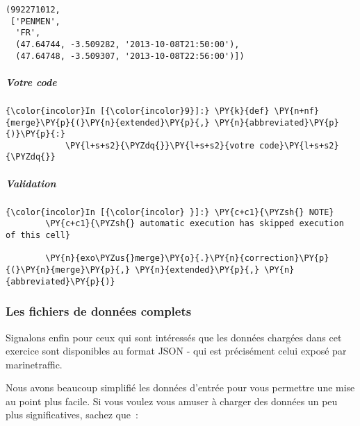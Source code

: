     \begin{Verbatim}[commandchars=\\\{\}]
(992271012,
 ['PENMEN',
  'FR',
  (47.64744, -3.509282, '2013-10-08T21:50:00'),
  (47.64748, -3.509307, '2013-10-08T22:56:00')])

    \end{Verbatim}

    \hypertarget{votre-code}{%
\subparagraph{Votre code}\label{votre-code}}

    \begin{Verbatim}[commandchars=\\\{\}]
{\color{incolor}In [{\color{incolor}9}]:} \PY{k}{def} \PY{n+nf}{merge}\PY{p}{(}\PY{n}{extended}\PY{p}{,} \PY{n}{abbreviated}\PY{p}{)}\PY{p}{:}
            \PY{l+s+s2}{\PYZdq{}}\PY{l+s+s2}{votre code}\PY{l+s+s2}{\PYZdq{}}
\end{Verbatim}


    \hypertarget{validation}{%
\subparagraph{Validation}\label{validation}}

    \begin{Verbatim}[commandchars=\\\{\}]
{\color{incolor}In [{\color{incolor} }]:} \PY{c+c1}{\PYZsh{} NOTE}
        \PY{c+c1}{\PYZsh{} automatic execution has skipped execution of this cell}
        
        \PY{n}{exo\PYZus{}merge}\PY{o}{.}\PY{n}{correction}\PY{p}{(}\PY{n}{merge}\PY{p}{,} \PY{n}{extended}\PY{p}{,} \PY{n}{abbreviated}\PY{p}{)}
\end{Verbatim}


    \hypertarget{les-fichiers-de-donnuxe9es-complets}{%
\subsubsection{Les fichiers de données
complets}\label{les-fichiers-de-donnuxe9es-complets}}

    Signalons enfin pour ceux qui sont intéressés que les données chargées
dans cet exercice sont disponibles au format JSON - qui est précisément
celui exposé par marinetraffic.

Nous avons beaucoup simplifié les données d'entrée pour vous permettre
une mise au point plus facile. Si vous voulez vous amuser à charger des
données un peu plus significatives, sachez que~:

